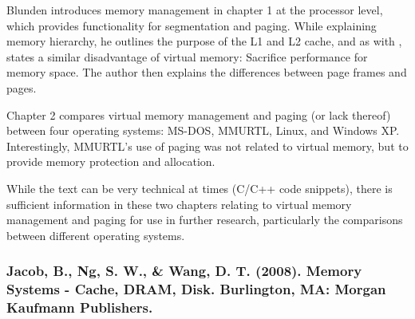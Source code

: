 Blunden introduces memory management in chapter 1 at the processor level, which provides functionality for segmentation and paging. While explaining memory hierarchy, he outlines the purpose of the L1 and L2 cache, and as with \citet{Blanchet2012}, states a similar disadvantage of virtual memory: Sacrifice performance for memory space. The author then explains the differences between page frames and pages.

Chapter 2 compares virtual memory management and paging (or lack thereof) between four operating systems: MS-DOS, MMURTL, Linux, and Windows XP. Interestingly, MMURTL's use of paging was not related to virtual memory, but to provide memory protection and allocation.

While the text can be very technical at times (C/C++ code snippets), there is sufficient information in these two chapters relating to virtual memory management and paging for use in further research, particularly the comparisons between different operating systems.

\subsubsection*{Jacob, B., Ng, S. W., \& Wang, D. T. (2008). Memory Systems - Cache, DRAM, Disk. Burlington, MA: Morgan Kaufmann Publishers.}
